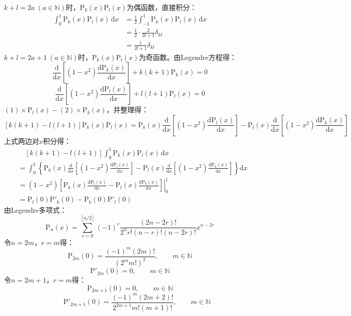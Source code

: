 \documentclass[fontset=windows]{ctexart}
\begin{document}
\begin{itemize}
    $k+l=2a\ (a\in\mathbb{N})$时，$\mathrm{P}_k(x)\mathrm{P}_l(x)$为偶函数，直接积分：
    \begin{align*}
        \int_{0}^{1}\mathrm{P}_k(x)\mathrm{P}_l(x)\,\mathrm{d}x
        &= \frac{1}{2}\int_{-1}^{1}\mathrm{P}_k(x)\mathrm{P}_l(x)\,\mathrm{d}x \\
        &= \frac{1}{2}\cdot\frac{2}{2l+1}\delta_{kl} \\
        &= \frac{1}{2l+1}\delta_{kl}
    \end{align*}
    $k+l=2a+1\ (a\in\mathbb{N})$时，$\mathrm{P}_k(x)\mathrm{P}_l(x)$为奇函数。由Legendre方程得：
    \[
        \frac{\mathrm{d}}{\mathrm{d}x}\left[(1-x^2)\frac{\mathrm{d}\mathrm{P}_k(x)}{\mathrm{d}x}\right] + k(k+1)\mathrm{P}_k(x) = 0 \tag{1}
    \]
    \[
        \frac{\mathrm{d}}{\mathrm{d}x}\left[(1-x^2)\frac{\mathrm{d}\mathrm{P}_l(x)}{\mathrm{d}x}\right] + l(l+1)\mathrm{P}_l(x) = 0 \tag{2}
    \]
    $(1)\times \mathrm{P}_l(x) - (2)\times \mathrm{P}_k(x)$，并整理得：
    \[
    [k(k+1)-l(l+1)]\mathrm{P}_k(x)\mathrm{P}_l(x) = \mathrm{P}_k(x)\frac{\mathrm{d}}{\mathrm{d}x}\left[(1-x^2)\frac{\mathrm{d}\mathrm{P}_l(x)}{\mathrm{d}x}\right] - \mathrm{P}_l(x)\frac{\mathrm{d}}{\mathrm{d}x}\left[(1-x^2)\frac{\mathrm{d}\mathrm{P}_k(x)}{\mathrm{d}x}\right]
    \]
    上式两边对$x$积分得：
    \begin{align*}
        &\quad[k(k+1)-l(l+1)]\int_{0}^{1}\mathrm{P}_k(x)\mathrm{P}_l(x)\,\mathrm{d}x \\
        &= \int_{0}^{1}\left\{\mathrm{P}_k(x)\frac{\mathrm{d}}{\mathrm{d}x}\left[(1-x^2)\frac{\mathrm{d}\mathrm{P}_l(x)}{\mathrm{d}x}\right] - \mathrm{P}_l(x)\frac{\mathrm{d}}{\mathrm{d}x}\left[(1-x^2)\frac{\mathrm{d}\mathrm{P}_k(x)}{\mathrm{d}x}\right]\right\}\mathrm{d}x \\
        &= \left.(1-x^2)\left[\mathrm{P}_k(x)\frac{\mathrm{d}\mathrm{P}_l(x)}{\mathrm{d}x} - \mathrm{P}_l(x)\frac{\mathrm{d}\mathrm{P}_k(x)}{\mathrm{d}x}\right]\right|_{0}^{1} \\
        &= \mathrm{P}_l(0)\mathrm{P}'_k(0) - \mathrm{P}_k(0)\mathrm{P}'_l(0)
    \end{align*}
    由Legendre多项式：
    \[
        \mathrm{P}_n(x) = \sum_{r=0}^{[n/2]}(-1)^r\frac{(2n-2r)!}{2^n r!(n-r)!(n-2r)!}x^{n-2r}
    \]
    令$n=2m$，$r=m$得：
    \[
        \mathrm{P}_{2m}(0) = \frac{(-1)^m(2m)!}{(2^m m!)^2},\qquad m\in\mathbb{N}
    \]
    \[
        \mathrm{P}'_{2m}(0) = 0,\qquad m\in\mathbb{N}
    \]
    令$n=2m+1$，$r=m$得：
    \[
    \mathrm{P}_{2m+1}(0) = 0,\qquad m\in\mathbb{N}
    \]
    \[
    \qquad \mathrm{P}'_{2m+1}(0) = \frac{(-1)^m (2m+2)!}{2^{2m+1} m!(m+1)!},\qquad m\in\mathbb{N}
\]
\end{itemize}
\end{document}

